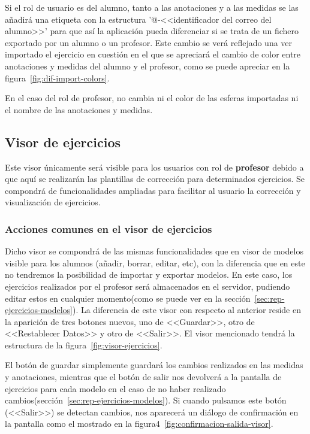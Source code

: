 Si el rol de usuario es del alumno, tanto a las anotaciones y a las medidas se las añadirá una etiqueta con la estructura '@-<<identificador del correo del alumno>>' para que así la aplicación pueda diferenciar si se trata de un fichero exportado por un alumno o un profesor. Este cambio se verá reflejado una ver importado el ejercicio en cuestión en el que se apreciará el cambio de color entre anotaciones y medidas del alumno y el profesor, como se puede apreciar en la figura~\ref{fig:dif-import-colors}.


En el caso del rol de profesor, no cambia ni el color de las esferas importadas ni el nombre de las anotaciones y medidas.


\subsection{Visor de ejercicios}\label{sec:visor-ejercicios}
Este visor únicamente será visible para los usuarios con rol de \textbf{profesor} debido a que aquí se realizarán las plantillas de corrección para determinados ejercicios. Se compondrá de funcionalidades ampliadas para facilitar al usuario la corrección y visualización de ejercicios.

\subsubsection{Acciones comunes en el visor de ejercicios}
Dicho visor se compondrá de las mismas funcionalidades que en visor de modelos visible para los alumnos (añadir, borrar, editar, etc), con la diferencia que en este no tendremos la posibilidad de importar y exportar modelos. En este caso, los ejercicios realizados por el profesor será almacenados en el servidor, pudiendo editar estos en cualquier momento(como se puede ver en la sección~\ref{sec:rep-ejercicios-modelos}). La diferencia de este visor con respecto al anterior reside en la aparición de tres botones nuevos, uno de <<Guardar>>, otro de <<Restablecer Datos>> y otro de <<Salir>>. El visor mencionado tendrá la estructura de la figura~\ref{fig:visor-ejercicios}.

El botón de guardar simplemente guardará los cambios realizados en las medidas y anotaciones, mientras que el botón de salir nos devolverá a la pantalla de ejercicios para cada modelo en el caso de no haber realizado cambios(sección~\ref{sec:rep-ejercicios-modelos}). Si cuando pulsamos este botón (<<Salir>>) se detectan cambios, nos aparecerá un diálogo de confirmación en la pantalla como el mostrado en la figura4~\ref{fig:confirmacion-salida-visor}.

